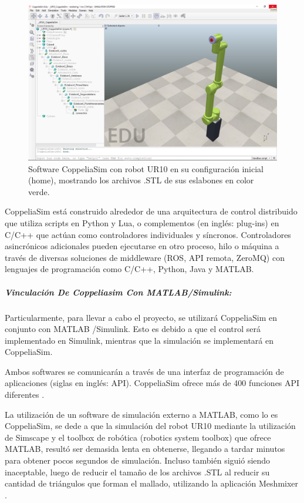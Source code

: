 \documentclass{article}
\begin{document}
\begin{sloppypar}
\begin{figure}[H]
    \centering
    \includegraphics[width=1\textwidth] {Software CoppeliaSim}
    \caption{Software CoppeliaSim con robot UR10 en su configuración inicial (home), mostrando los archivos .STL de sus eslabones en color verde.}
    \label{fig:Software CoppeliaSim}
\end{figure}

CoppeliaSim está construido alrededor de una arquitectura de control distribuido que utiliza scripts en Python y Lua, o complementos (en inglés: plug-ins) en C/C++ que actúan como controladores individuales y síncronos. Controladores asincrónicos adicionales pueden ejecutarse en otro proceso, hilo o máquina a través de diversas soluciones de middleware (ROS, API remota, ZeroMQ) con lenguajes de programación como C/C++, Python, Java y MATLAB.


\subparagraph{Vinculación De Coppeliasim Con MATLAB/Simulink:}
\label{sec:Vinculación De Coppeliasim Con MATLAB/Simulink:}
\hfill

Particularmente, para llevar a cabo el proyecto, se utilizará CoppeliaSim en conjunto con MATLAB /Simulink. Esto es debido a que el control será implementado en Simulink, mientras que la simulación se implementará en CoppeliaSim.

Ambos softwares se comunicarán a través de una interfaz de programación de aplicaciones (siglas en inglés: API). CoppeliaSim ofrece más de 400 funciones API diferentes \cite{CoppeliaSim_API_Functions}.

La utilización de un software de simulación externo a MATLAB, como lo es CoppeliaSim, se dede a que la simulación del robot UR10 mediante la utilización de Simscape y el toolbox de robótica (robotics system toolbox) que ofrece MATLAB, resultó ser demasida lenta en obtenerse, llegando a tardar minutos para obtener pocos segundos de simulación. Incluso también siguió siendo inaceptable, luego de reducir el tamaño de los archivos .STL al reducir su cantidad de triángulos que forman el mallado, utilizando la aplicación Meshmixer \cite{Meshmixer}.


\end{sloppypar}
\end{document}
